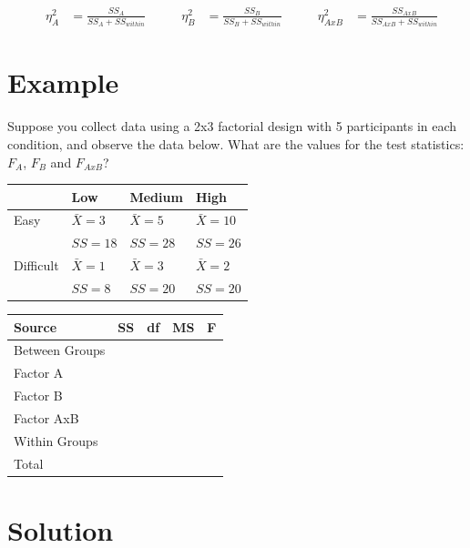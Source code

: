 \documentclass{tufte-handout}
\begin{document}
\begin{align*}
&\eta^2_A&=\frac{SS_A}{SS_A+SS_{within}} 	\qquad
&\eta^2_B&=\frac{SS_B}{SS_B+SS_{within}} 	\qquad
&\eta^2_{AxB}&=\frac{SS_{AxB}}{SS_{AxB}+SS_{within}}
\end{align*}


\section{Example}

Suppose you collect data using a 2x3 factorial design with 5 participants in each condition, and observe the data below. What are the values for the test statistics: $F_A$, $F_B$ and $F_{AxB}$?

\begin{table}
  \centering
  \selectfont
  \begin{tabular}{llll}
    \toprule
    & Low & Medium & High\\
    \midrule
    Easy & $\bar{X}=3$ & $\bar{X}=5$ & $\bar{X}=10$\\
    & $SS=18$ & $SS=28$ & $SS=26$\\	
    Difficult & $\bar{X}=1$ & $\bar{X}=3$ & $\bar{X}=2$\\
    & $SS=8$ & $SS=20$ & $SS=20$\\	
    \bottomrule
  \end{tabular}
  \label{tab:normaltab}
\end{table}

\vspace{4.5 in}

\begin{table}
  \centering
  \selectfont
  \begin{tabular}{lllll}
    \toprule
    Source & \qquad SS & \qquad df & \qquad MS & \qquad F \\
    \midrule
    Between Groups & & & & \\
    \qquad Factor A & & & & \\
    \qquad Factor B & & & & \\
    \qquad Factor AxB & & & & \\
    Within Groups & & & & \\
    Total & & & & \\
    \bottomrule
  \end{tabular}
  \label{tab:normaltab}
\end{table}


\section{Solution}
\end{document}
